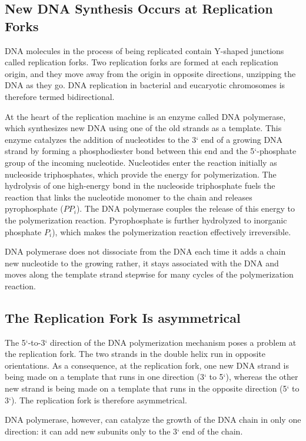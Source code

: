 \subsection{New DNA Synthesis Occurs at Replication Forks}

DNA molecules in the process of being replicated contain Y-shaped junctions
called replication forks. Two replication forks are formed at each replication origin, and
they move away from the origin in opposite directions, unzipping the DNA
as they go. DNA replication in bacterial and eucaryotic chromosomes
is therefore termed bidirectional.

At the heart of the replication machine is an enzyme called DNA
polymerase, which synthesizes new DNA using one of the old strands
as a template. This enzyme catalyzes the addition of nucleotides to the 3`
end of a growing DNA strand by forming a phosphodiester bond between
this end and the 5`-phosphate group of the incoming nucleotide.
Nucleotides enter the reaction initially as nucleoside triphosphates,
which provide the energy for polymerization. The hydrolysis of one high-energy
bond in the nucleoside triphosphate fuels the reaction that links
the nucleotide monomer to the chain and releases pyrophosphate ($PP_{i}$).
The DNA polymerase couples the release of this energy to the polymerization
reaction. Pyrophosphate is further hydrolyzed to inorganic
phosphate $P_i$), which makes the polymerization reaction effectively irreversible.

DNA polymerase does not dissociate from the DNA each time it adds a chain
new nucleotide to the growing rather, it stays associated with the
DNA and moves along the template strand stepwise for many cycles of
the polymerization reaction.

\subsection{The Replication Fork Is asymmetrical}

The 5`-to-3` direction of the DNA polymerization mechanism poses a
problem at the replication fork.
The two strands in the double helix run in
opposite orientations. As a consequence, at the replication fork, one new
DNA strand is being made on a template that runs in one direction (3`
to 5`), whereas the other new strand is being made on a template that
runs in the opposite direction (5` to 3`). The replication fork is therefore
asymmetrical.

DNA polymerase, however, can catalyze the growth of the DNA chain in
only one direction: it can add new subunits only to the 3` end of the chain.

